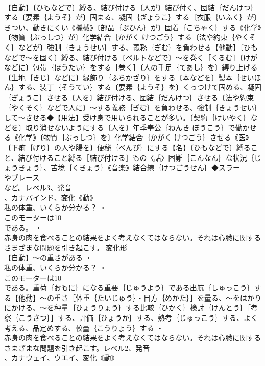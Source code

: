\documentclass[8pt]{extreport}
\begin{document}
\begin{CJK}{UTF8}{min}
\\	【自動】〔ひもなどで〕縛る、結び付ける〔人が〕結び付く、団結｛だんけつ｝する〔要素｛ようそ｝が〕固まる、凝固｛ぎょうこ｝する〔衣服｛いふく｝が〕きつい、動きにくい《機械》〔部品｛ぶひん｝が〕固着｛こちゃく｝する《化学》〔物質｛ぶっしつ｝が〕化学結合｛かがく けつごう｝する〔法や約束｛やくそく｝などが〕強制｛きょうせい｝する、義務｛ぎむ｝を負わせる【他動】〔ひもなどで～を固く〕縛る、結び付ける〔ベルトなどで〕～を巻く［くるむ］〔けがなどに〕包帯｛ほうたい｝をする［巻く］〔人の手足｛てあし｝を〕縛り上げる〔生地｛きじ｝などに〕縁飾り｛ふちかざり｝をする〔本などを〕製本｛せいほん｝する、装丁｛そうてい｝する〔要素｛ようそ｝を〕くっつけて固める、凝固｛ぎょうこ｝させる〔人を〕結び付ける、団結｛だんけつ｝させる〔法や約束｛やくそく｝などで人に〕～する義務｛ぎむ｝を負わせる、強制｛きょうせい｝して～させる◆【用法】受け身で用いられることが多い。〔契約｛けいやく｝などを〕取り消せないようにする〔人を〕年季奉公｛ねんき ぼうこう｝で働かせる《化学》〔物質｛ぶっしつ｝を〕化学結合｛かがく けつごう｝させる《医》〔下痢｛げり｝の人や腸を〕便秘｛べんぴ｝にする【名】〔ひもなどで〕縛ること、結び付けること縛る［結び付ける］もの〈話〉困難｛こんなん｝な状況｛じょうきょう｝、苦境｛くきょう｝《音楽》結合線｛けつごうせん｝◆スラー
\\	やブレース
\\	など。レベル3、発音
\\	、カナバインド、変化《動》
\\	私の体重、いくらか分かる？ ・
\\	このモーターは10
\\	である。 ・
\\	赤身の肉を食べることの結果をよく考えなくてはならない。それは心臓に関するさまざまな問題を引き起こす。	変化形 
\\	【自動】～の重さがある ・
\\	私の体重、いくらか分かる？ ・
\\	このモーターは10
\\	である。重荷｛おもに｝になる重要｛じゅうよう｝である出航｛しゅっこう｝する【他動】～の重さ［体重｛たいじゅう｝・目方｛めかた｝］を量る、～をはかりにかける、～を秤量｛ひょうりょう｝する比較｛ひかく｝検討｛けんとう｝［考察｛こうさつ｝］する、評価｛ひょうか｝する、熟考｛じゅっこう｝する、よく考える、品定めする、較量｛こうりょう｝する ・
\\	赤身の肉を食べることの結果をよく考えなくてはならない。それは心臓に関するさまざまな問題を引き起こす。レベル2、発音
\\	、カナウェイ、ウエイ、変化《動》

\end{CJK}
\end{document}
